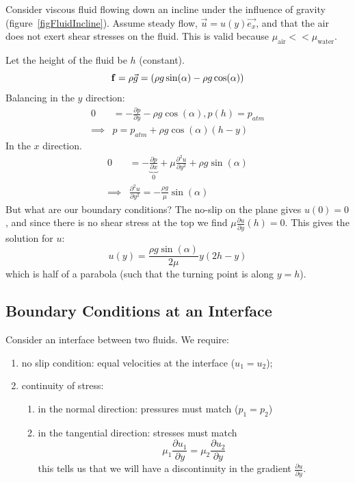 \documentclass[../Main.tex]{subfiles}
\begin{document}
\begin{example}
    Consider viscous fluid flowing down an incline under the influence of gravity (figure~\ref{figFluidIncline}). Assume steady flow, $\vec{u} = u(y) \vec{e_x}$, and that the air does not exert shear stresses on the fluid. This is valid because $\mu_{\text{air}} << \mu_{\text{water}}$.
    
    Let the height of the fluid be $h$ (constant).
    \begin{equation*}
        \bdforce = \rho \vec{g} = \left(\rho g \sin(\alpha) - \rho g \cos(\alpha)\right) %
    \end{equation*}
    Balancing in the $y$ direction:
    \begin{align*}
        0&= -\frac{\partial p}{\partial y} - \rho g \cos(\alpha), p(h) = p_{atm} \\
        \implies& p = p_{atm} + \rho g \cos(\alpha) (h - y)
    \end{align*}
    In the $x$ direction.
    \begin{align*}
        0 &= -\underbrace{\frac{\partial p}{\partial x}}_{0} + \mu \frac{\partial^{2}u}{\partial y^{2}} + \rho g \sin(\alpha) \\
        \implies& \frac{\partial^{2}u}{\partial y^{2}} = -\frac{\rho g}{\mu} \sin(\alpha)
    \end{align*}
    But what are our boundary conditions? The no-slip on the plane gives $u(0) = 0$, and since there is no shear stress at the top we find $\mu \frac{\partial u}{\partial y}(h) = 0$. This gives the solution for $u$:
    \begin{equation*}
        u(y) = \frac{\rho g \sin(\alpha)}{2\mu}y(2h - y)
    \end{equation*}
    which is half of a parabola (such that the turning point is along $y = h$).
\end{example}
\subsection{Boundary Conditions at an Interface}
Consider an interface between two fluids. We require:
\begin{enumerate}
    \item no slip condition: equal velocities at the interface ($u_1 = u_2$);
    \item continuity of stress:
        \begin{enumerate}
            \item in the normal direction: pressures must match ($p_1 = p_2$)
            \item in the tangential direction: stresses must match
                \begin{equation*}
                    \mu_1 \frac{\partial u_1}{\partial y} = \mu_2 \frac{\partial u_2}{\partial y}
                \end{equation*}
                this tells us that we will have a discontinuity in the gradient $\frac{\partial u}{\partial y}$.
        \end{enumerate}
\end{enumerate}
\end{document}
